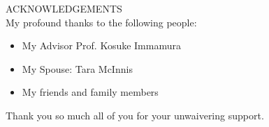 ACKNOWLEDGEMENTS\\

My profound thanks to the following people:
\begin{itemize}
    \item My Advisor Prof. Kosuke Immamura
    \item My Spouse: Tara McInnis
    \item My friends and family members
\end{itemize}

Thank you so much all of you for your unwaivering support.

\newpage
